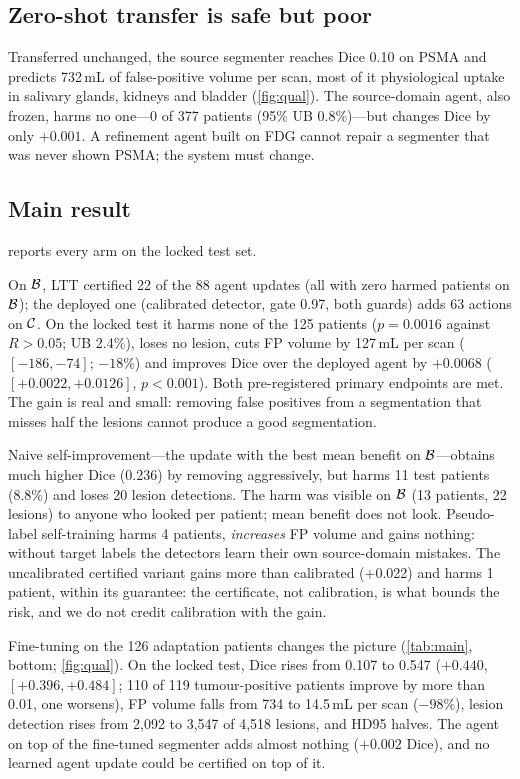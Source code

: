 \subsection{Zero-shot transfer is safe but poor}
\label{sec:zeroshot}
Transferred unchanged, the source segmenter reaches Dice 0.10 on PSMA and predicts 732\,mL of false-positive volume per scan, most of it physiological uptake in salivary glands, kidneys and bladder (\cref{fig:qual}).
The source-domain agent, also frozen, harms no one---0 of 377 patients (95\% UB 0.8\%)---but changes Dice by only $+0.001$.
A refinement agent built on FDG cannot repair a segmenter that was never shown PSMA; the system must change.

\subsection{Main result}
\label{sec:main}
 reports every arm on the locked test set.

On $\mathcal{B}$, LTT certified 22 of the 88 agent updates (all with zero harmed patients on $\mathcal{B}$); the deployed one (calibrated detector, gate 0.97, both guards) adds 63 actions on $\mathcal{C}$.
On the locked test it harms none of the 125 patients ($p=0.0016$ against $R>0.05$; UB 2.4\%), loses no lesion, cuts FP volume by 127\,mL per scan ($[-186,-74]$; $-18\%$) and improves Dice over the deployed agent by $+0.0068$ ($[+0.0022,+0.0126]$, $p<0.001$).
Both pre-registered primary endpoints are met.
The gain is real and small: removing false positives from a segmentation that misses half the lesions cannot produce a good segmentation.

Naive self-improvement---the update with the best mean benefit on $\mathcal{B}$---obtains much higher Dice (0.236) by removing aggressively, but harms 11 test patients (8.8\%) and loses 20 lesion detections.
The harm was visible on $\mathcal{B}$ (13 patients, 22 lesions) to anyone who looked per patient; mean benefit does not look.
Pseudo-label self-training harms 4 patients, \emph{increases} FP volume and gains nothing: without target labels the detectors learn their own source-domain mistakes.
The uncalibrated certified variant gains more than calibrated \ours (+0.022) and harms 1 patient, within its guarantee: the certificate, not calibration, is what bounds the risk, and we do not credit calibration with the gain.

Fine-tuning on the 126 adaptation patients changes the picture (\cref{tab:main}, bottom; \cref{fig:qual}).
On the locked test, Dice rises from 0.107 to 0.547 ($+0.440$, $[+0.396,+0.484]$; 110 of 119 tumour-positive patients improve by more than 0.01, one worsens), FP volume falls from 734 to 14.5\,mL per scan ($-98\%$), lesion detection rises from 2,092 to 3,547 of 4,518 lesions, and HD95 halves.
The agent on top of the fine-tuned segmenter adds almost nothing ($+0.002$ Dice), and no learned agent update could be certified on top of it.

